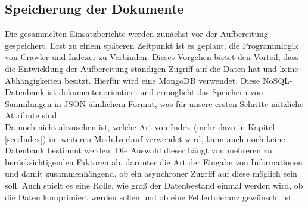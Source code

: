 \subsection{Speicherung der Dokumente}
\label{sec:Speicherung}
Die gesammelten Einsatzberichte werden zunächst vor der Aufbereitung gespeichert. Erst zu einem späteren Zeitpunkt ist es geplant, die Programmlogik von Crawler und Indexer zu Verbinden. Dieses Vorgehen bietet den Vorteil, dass die Entwicklung der Aufbereitung ständigen Zugriff auf die Daten hat und keine Abhängigkeiten besitzt. Hierfür wird eine MongoDB verwendet. Diese NoSQL-Datenbank ist dokumentenorientiert und ermöglicht das Speichern von Sammlungen in JSON-ähnlichem Format, was für unsere ersten Schritte nützliche Attribute sind.\\
Da noch nicht abzusehen ist, welche Art von Index (mehr dazu in Kapitel \ref{sec:Index}) im weiteren Modulverlauf verwendet wird, kann auch noch keine Datenbank bestimmt werden. Die Auswahl dieser hängt von mehreren zu berücksichtigenden Faktoren ab, darunter die Art der Eingabe von Informationen und damit zusammenhängend, ob ein asynchroner Zugriff auf diese möglich sein soll. Auch spielt es eine Rolle, wie groß der Datenbestand einmal werden wird, ob die Daten komprimiert werden sollen und ob eine Fehlertoleranz gewünscht ist. \cite{wikimongodb}

